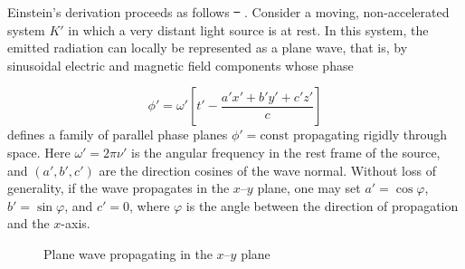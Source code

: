 \documentclass[pdflatex]{sn-jnl} %
\providecommand{\DIFadd}[1]{{\protect\color{blue}\uwave{#1}}} %
\providecommand{\DIFdel}[1]{{\protect\color{red}\sout{#1}}}                      %
\providecommand{\DIFaddbegin}{} %
\providecommand{\DIFaddend}{} %
\providecommand{\DIFdelbegin}{} %
\providecommand{\DIFdelend}{} %
\begin{document}
Einstein’s derivation proceeds as follows \DIFdelbegin \DIFdel{\mbox{%
\citep[910--911]{Einstein1905}}\hskip0pt%
}\DIFdelend \DIFaddbegin \DIFadd{\mbox{%
\citep[910--11]{Einstein1905}}\hskip0pt%
}\DIFaddend . Consider a moving, non-accelerated system $K'$ in which a very distant light source is at rest. In this system, the emitted radiation can locally be represented as a plane wave, that is, by sinusoidal electric and magnetic field components whose phase

\begin{equation*}
\phi'=\omega'\!\left[t'-\frac{a' x'+b' y'+c' z'}{c}\right]
\end{equation*}
defines a family of parallel phase planes $\phi'=\text{const}$ propagating rigidly through space. Here $\omega'=2\pi\nu'$ is the angular frequency in the rest frame of the source, and $(a',b',c')$ are the direction cosines of the wave normal. Without loss of generality, if the wave propagates in the $x$--$y$ plane, one may set $a'=\cos\varphi$, $b'=\sin\varphi$, and $c'=0$, where $\varphi$ is the angle between the direction of propagation and the $x$-axis.

\usetikzlibrary{calc}

\begin{figure}
\centering
{}
\caption{\label{fig:wave} Plane wave propagating in the $x$--$y$ plane}
\end{figure}
\end{document}

